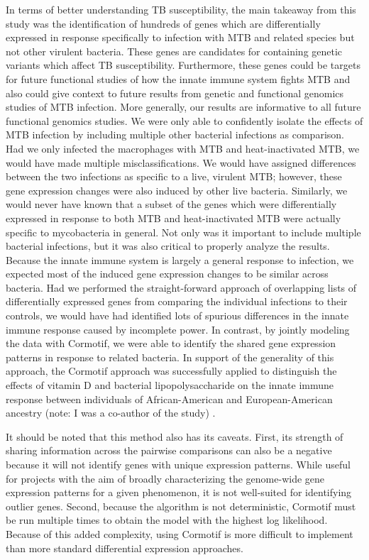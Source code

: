 In terms of better understanding TB susceptibility, the main takeaway from this
study was the identification of hundreds of genes which are differentially
expressed in response specifically to infection with MTB and related species but
not other virulent bacteria. These genes are candidates for containing genetic
variants which affect TB susceptibility. Furthermore, these genes could be
targets for future functional studies of how the innate immune system fights MTB
and also could give context to future results from genetic and functional
genomics studies of MTB infection. More generally, our results are informative
to all future functional genomics studies. We were only able to confidently
isolate the effects of MTB infection by including multiple other bacterial
infections as comparison. Had we only infected the macrophages with MTB and
heat-inactivated MTB, we would have made multiple misclassifications. We would
have assigned differences between the two infections as specific to a live,
virulent MTB; however, these gene expression changes were also induced by other
live bacteria. Similarly, we would never have known that a subset of the genes
which were differentially expressed in response to both MTB and heat-inactivated
MTB were actually specific to mycobacteria in general. Not only was it important
to include multiple bacterial infections, but it was also critical to properly
analyze the results. Because the innate immune system is largely a general
response to infection, we expected most of the induced gene expression changes
to be similar across bacteria. Had we performed the straight-forward approach of
overlapping lists of differentially expressed genes from comparing the
individual infections to their controls, we would have had identified lots of
spurious differences in the innate immune response caused by incomplete
power. In contrast, by jointly modeling the data with Cormotif, we were able to
identify the shared gene expression patterns in response to related bacteria. In
support of the generality of this approach, the Cormotif approach was
successfully applied to distinguish the effects of vitamin D and bacterial
lipopolysaccharide on the innate immune response between individuals of
African-American and European-American ancestry (note: I was a co-author of the
study) \citep{Kariuki2016}.

It should be noted that this method also has its caveats. First, its strength of
sharing information across the pairwise comparisons can also be a negative
because it will not identify genes with unique expression patterns. While useful
for projects with the aim of broadly characterizing the genome-wide gene
expression patterns for a given phenomenon, it is not well-suited for
identifying outlier genes. Second, because the algorithm is not deterministic,
Cormotif must be run multiple times to obtain the model with the highest log
likelihood. Because of this added complexity, using Cormotif is more difficult
to implement than more standard differential expression approaches.

